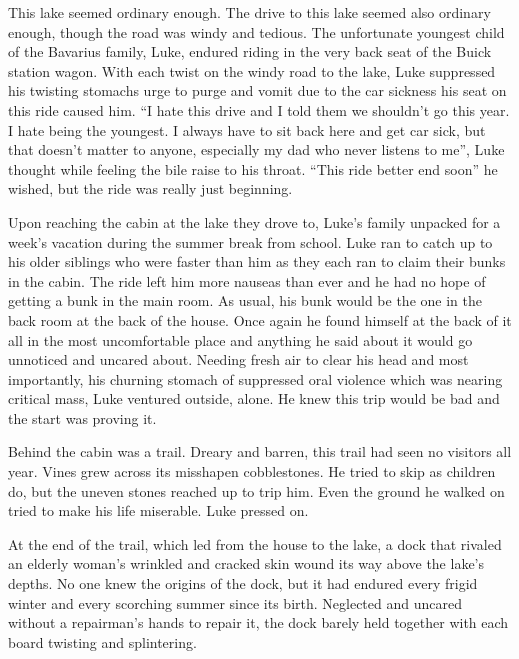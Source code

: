 This lake seemed ordinary enough. The drive to this lake seemed
also ordinary enough, though the road was windy and tedious. The
unfortunate youngest child of the Bavarius family, Luke, endured
riding in the very back seat of the Buick station wagon. With each
twist on the windy road to the lake, Luke suppressed his twisting
stomachs urge to purge and vomit due to the car sickness his seat
on this ride caused him. ``I hate this drive and I told them
we shouldn't go this year. I hate being the youngest. I
always have to sit back here and get car sick, but that
doesn't matter to anyone, especially my dad who never listens
to me'', Luke thought while feeling the bile raise to his
throat. ``This ride better end soon'' he wished, but the
ride was really just beginning.



Upon reaching the cabin at the lake they drove to, Luke's
family unpacked for a week's vacation during the summer break
from school. Luke ran to catch up to his older siblings who were
faster than him as they each ran to claim their bunks in the cabin.
The ride left him more nauseas than ever and he had no hope of
getting a bunk in the main room. As usual, his bunk would be the
one in the back room at the back of the house. Once again he found
himself at the back of it all in the most uncomfortable place and
anything he said about it would go unnoticed and uncared about.
Needing fresh air to clear his head and most importantly, his
churning stomach of suppressed oral violence which was nearing
critical mass, Luke ventured outside, alone. He knew this trip
would be bad and the start was proving it.



Behind the cabin was a trail. Dreary and barren, this trail had
seen no visitors all year. Vines grew across its misshapen
cobblestones. He tried to skip as children do, but the uneven
stones reached up to trip him. Even the ground he walked on tried
to make his life miserable. Luke pressed on.



At the end of the trail, which led from the house to the lake, a
dock that rivaled an elderly woman's wrinkled and cracked
skin wound its way above the lake's depths. No one knew the
origins of the dock, but it had endured every frigid winter and
every scorching summer since its birth. Neglected and uncared
without a repairman's hands to repair it, the dock barely
held together with each board twisting and splintering.



